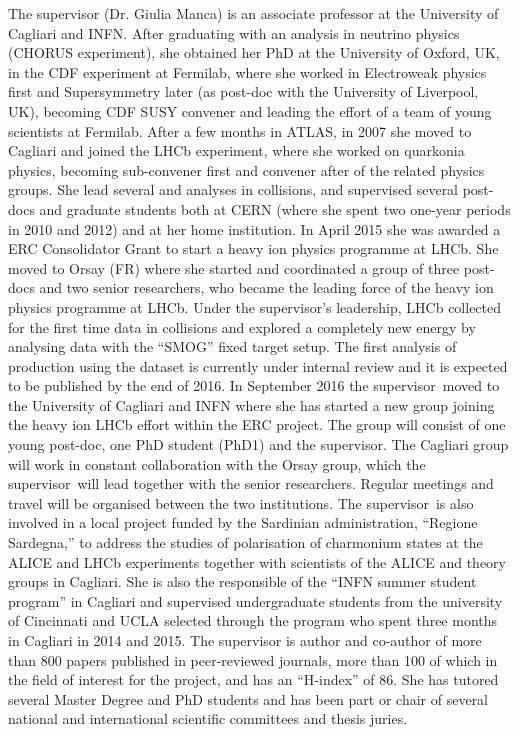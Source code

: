 \documentclass[a4paper,11pt]{article}
\newcommand{\supervisor}{the supervisor\xspace}
\newcommand{\Supervisor}{The supervisor\xspace}
\begin{document}
The supervisor (Dr. Giulia Manca) is an associate professor at the 
University of Cagliari and INFN. After graduating with an 
analysis in neutrino physics (CHORUS experiment), she obtained her 
PhD at the University of Oxford, UK, in the CDF experiment at Fermilab,
where she worked in Electroweak physics first and Supersymmetry later
(as post-doc with the University of Liverpool, UK), becoming 
CDF SUSY convener and leading the effort of a team of young scientists
at Fermilab.
After a few months in ATLAS, in 2007 she moved to Cagliari and 
joined the LHCb experiment, where she worked on quarkonia physics, 
becoming sub-convener first and convener after of the related physics groups.
She lead several \Jpsi and \PgU analyses in \pp
collisions, and supervised several post-docs and graduate 
students both at CERN (where she spent two one-year periods
in 2010 and 2012) and at her home institution. In April 2015 she
was awarded a ERC Consolidator Grant to start a heavy ion physics 
programme at LHCb. She moved to Orsay (FR) 
where she started and coordinated a group of three post-docs and 
two senior researchers, who became the leading force of the 
heavy ion physics programme at LHCb. Under \supervisor's 
leadership, LHCb collected for the first time data in \PbPb 
collisions and explored a completely new energy by analysing
data with the ``SMOG'' fixed target setup.
The first analysis of \JPsi production using the \PbPb dataset 
is currently under internal review
and it is expected to be published by the end of 2016. 
In September 2016 \supervisor\ moved to the University of Cagliari and INFN where 
she has started a new group joining the heavy ion LHCb effort within 
the ERC project. The group will consist
of one young post-doc, one PhD student (PhD1) and \supervisor. 
The Cagliari group will work 
in constant collaboration with the Orsay group, which \supervisor\
will lead together with the senior researchers. Regular meetings and 
travel will be organised between the two institutions.
\Supervisor\ is also involved in a local project funded by the 
Sardinian administration, ``Regione Sardegna,'' to address the studies of 
polarisation of charmonium states at the ALICE and LHCb experiments
together with scientists of the ALICE and theory groups in Cagliari.
She is also the responsible of the ``INFN summer student program'' in 
Cagliari and supervised undergraduate students from the 
university of Cincinnati 
and UCLA selected through the program who spent three
months in Cagliari in 2014 and 2015.
\Supervisor is author and co-author of more than 800 
papers published in peer-reviewed journals, more than 100 of which 
in the field of interest for the project, and has an ``H-index'' of 86.
She has tutored several Master Degree and PhD students and has
 been part or chair of several national
and international scientific committees and thesis juries.
\end{document}
